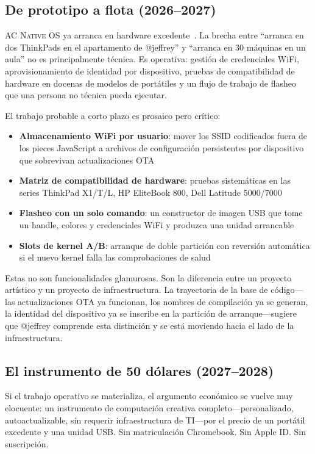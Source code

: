 \documentclass[10pt,letterpaper,twocolumn]{article}
\newcommand{\acos}{\textsc{AC Native OS}}
\begin{document}
\subsection{De prototipo a flota (2026--2027)}

\acos{} ya arranca en hardware excedente~\citep{scudder2026os}. La brecha entre ``arranca en dos ThinkPads en el apartamento de @jeffrey'' y ``arranca en 30 máquinas en un aula'' no es principalmente técnica. Es operativa: gestión de credenciales WiFi, aprovisionamiento de identidad por dispositivo, pruebas de compatibilidad de hardware en docenas de modelos de portátiles y un flujo de trabajo de flasheo que una persona no técnica pueda ejecutar.

El trabajo probable a corto plazo es prosaico pero crítico:

\begin{itemize}
  \item \textbf{Almacenamiento WiFi por usuario}: mover los SSID codificados fuera de los pieces JavaScript a archivos de configuración persistentes por dispositivo que sobrevivan actualizaciones OTA
  \item \textbf{Matriz de compatibilidad de hardware}: pruebas sistemáticas en las series ThinkPad X1/T/L, HP EliteBook 800, Dell Latitude 5000/7000
  \item \textbf{Flasheo con un solo comando}: un constructor de imagen USB que tome un handle, colores y credenciales WiFi y produzca una unidad arrancable
  \item \textbf{Slots de kernel A/B}: arranque de doble partición con reversión automática si el nuevo kernel falla las comprobaciones de salud
\end{itemize}

Estas no son funcionalidades glamurosas. Son la diferencia entre un proyecto artístico y un proyecto de infraestructura. La trayectoria de la base de código---las actualizaciones OTA ya funcionan, los nombres de compilación ya se generan, la identidad del dispositivo ya se inscribe en la partición de arranque---sugiere que @jeffrey comprende esta distinción y se está moviendo hacia el lado de la infraestructura.

\subsection{El instrumento de 50 dólares (2027--2028)}

Si el trabajo operativo se materializa, el argumento económico se vuelve muy elocuente: un instrumento de computación creativa completo---personalizado, autoactualizable, sin requerir infraestructura de TI---por el precio de un portátil excedente y una unidad USB. Sin matriculación Chromebook. Sin Apple ID. Sin suscripción.
\end{document}
